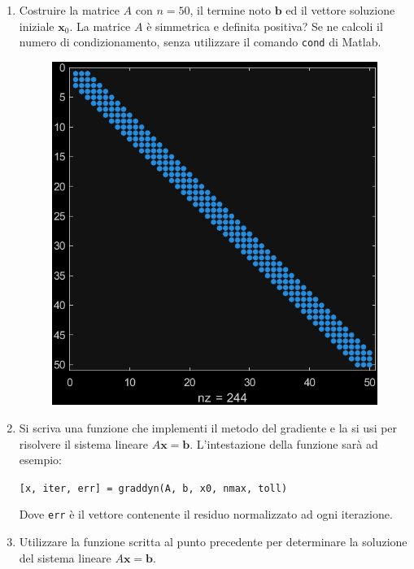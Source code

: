 \begin{enumerate}
    \item Costruire la matrice $A$ con $n = 50$, il termine noto $\mathbf{b}$ ed il vettore soluzione iniziale $\mathbf{x}_{0}$. La matrice $A$ è simmetrica e definita positiva? Se ne calcoli il numero di condizionamento, senza utilizzare il comando \texttt{cond} di Matlab.
    
    \newpage
    \begin{figure}[!htp]
        \centering
        \includegraphics[width=.6\textwidth]{img/gradiente-1.pdf}
    \end{figure}

    \item Si scriva una funzione che implementi il metodo del gradiente e la si usi per risolvere il sistema lineare $A\mathbf{x} = \mathbf{b}$. L'intestazione della funzione sarà ad esempio:
    \begin{center}
        \texttt{[x, iter, err] = graddyn(A, b, x0, nmax, toll)}
    \end{center}
    Dove \texttt{err} è il vettore contenente il residuo normalizzato ad ogni iterazione.
    

    \item Utilizzare la funzione scritta al punto precedente per determinare la soluzione del sistema lineare $A\mathbf{x} = \mathbf{b}$.
    


\end{enumerate}
